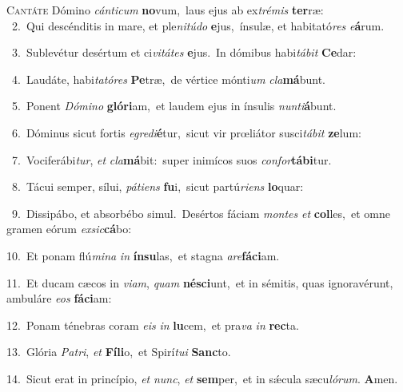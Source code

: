 \lettrine{\initial\textcolor{\initialcolor}{C}}{antáte} Dómino \textit{cán}\-\textit{ti}\textit{cum} \textbf{no}\-vum,~\star laus ejus ab ex\-\textit{tré}\-\textit{mis} \textbf{ter}\-ræ:\\
{\numbfont\textcolor{\numbcolor}{~2.}}~Qui descénditis in mare, et ple\-\textit{ni}\-\textit{tú}\textit{do} \textbf{e}\-jus,~\star ínsulæ, et habitató\textit{res} \textit{e}\-\textbf{á}rum.\par
{\numbfont\textcolor{\numbcolor}{~3.}}~Sublevétur desértum et ci\-\textit{vi}\-\textit{tá}\textit{tes} \textbf{e}\-jus.~\star In dómibus habi\-\textit{tá}\-\textit{bit} \textbf{Ce}\-dar:\par
{\numbfont\textcolor{\numbcolor}{~4.}}~Laudáte, habi\-\textit{ta}\-\textit{tó}\textit{res} \textbf{Pe}\-træ,~\star de vértice mónti\textit{um} \textit{cla}\-\textbf{má}bunt.\par
{\numbfont\textcolor{\numbcolor}{~5.}}~Ponent \textit{Dó}\-\textit{mi}\textit{no} \textbf{gló}\-\textbf{ri}am,~\star et laudem ejus in ínsulis \textit{nun}\-\textit{ti}\textbf{á}bunt.\par
{\numbfont\textcolor{\numbcolor}{~6.}}~Dóminus sicut fortis \textit{e}\-\textit{gre}\textit{di}\textbf{é}tur,~\star sicut vir prœliátor susci\-\textit{tá}\-\textit{bit} \textbf{ze}\-lum:\par
{\numbfont\textcolor{\numbcolor}{~7.}}~Vociferábi\-\textit{tur}\-, \textit{et} \textit{cla}\-\textbf{má}bit:~\star super inimícos suos \textit{con}\-\textit{for}\textbf{tá}\textbf{bi}tur.\par
{\numbfont\textcolor{\numbcolor}{~8.}}~Tácui semper, sílui, \textit{pá}\-\textit{ti}\textit{ens} \textbf{fu}\-i,~\star sicut partú\-\textit{ri}\-\textit{ens} \textbf{lo}\-quar:\par
{\numbfont\textcolor{\numbcolor}{~9.}}~Dissipábo, et absorbébo simul.~\dagger Desértos fáciam \textit{mon}\-\textit{tes} \textit{et} \textbf{col}\-les,~\star et omne gramen eórum \textit{ex}\-\textit{sic}\textbf{cá}bo:\par
{\numbfont\textcolor{\numbcolor}{10.}}~Et ponam flú\-\textit{mi}\-\textit{na} \textit{in} \textbf{ín}\-\textbf{su}las,~\star et stagna \textit{a}\-\textit{re}\textbf{fá}\textbf{ci}am.\par
{\numbfont\textcolor{\numbcolor}{11.}}~Et ducam cæcos in \textit{vi}\-\textit{am}, \textit{quam} \textbf{né}\-\textbf{sci}unt,~\star et in sémitis, quas ignoravérunt, ambuláre \textit{e}\-\textit{os} \textbf{fá}\-\textbf{ci}am:\par
{\numbfont\textcolor{\numbcolor}{12.}}~Ponam ténebras coram \textit{e}\-\textit{is} \textit{in} \textbf{lu}\-cem,~\star et pra\textit{va} \textit{in} \textbf{rec}\-ta.\par
{\numbfont\textcolor{\numbcolor}{13.}}~Glória \textit{Pa}\-\textit{tri}, \textit{et} \textbf{Fí}\-\textbf{li}o,~\star et Spirí\-\textit{tu}\-\textit{i} \textbf{Sanc}\-to.\par
{\numbfont\textcolor{\numbcolor}{14.}}~Sicut erat in princípio, \textit{et} \textit{nunc}\-, \textit{et} \textbf{sem}\-per,~\star et in sǽcula sæcu\-\textit{ló}\-\textit{rum}. \textbf{A}\-men.\par
